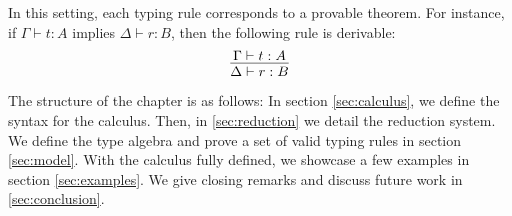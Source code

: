 In this setting, each typing rule corresponds to a provable theorem. For instance, if $\Gamma \vdash t : A$ implies $\Delta \vdash r : B$, then the following rule is derivable:
\[
  \infer{\Delta\vdash r:B}{\Gamma\vdash t:A}
\]

The structure of the chapter is as follows: In section \ref{sec:calculus}, we define the syntax for the calculus. Then, in \ref{sec:reduction} we detail the reduction system. We define the type algebra and prove a set of valid typing rules in section \ref{sec:model}. With the calculus fully defined, we showcase a few examples in section \ref{sec:examples}. We give closing remarks and discuss future work in \ref{sec:conclusion}.
